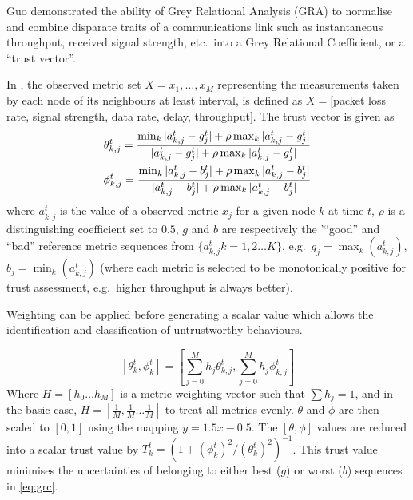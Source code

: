 Guo\cite{Guo11} demonstrated the ability of Grey Relational Analysis (GRA)\cite{Zuo1995} to normalise and combine disparate traits of a communications link such as instantaneous throughput, received signal strength, etc.\ into a Grey Relational Coefficient, or a ``trust vector''.

In \cite{Guo11}, the observed metric set $X = {x_1,\dots,x_M}$ representing the measurements taken by each node of its neighbours at least interval, is defined as $X=[$packet loss rate, signal strength, data rate, delay, throughput$]$.
The trust vector is given as
%
\begin{align}
  \theta_{k,j}^t = \frac{\min_k|a_{k,j}^t - g_j^t| + \rho \max_k|a_{k,j}^t-g_j^t|}{|a_{k,j}^t-g_j^t| + \rho \max_k|a_{k,j}^t-g_j^t|} \\
  \phi_{k,j}^t = \frac{\min_k|a_{k,j}^t - b_j^t| + \rho \max_k|a_{k,j}^t-b_j^t|}{|a_{k,j}^t-b_j^t| + \rho \max_k|a_{k,j}^t-b_j^t|} \notag 
\end{align}
%
where $a_{k,j}^t$ is the value of a observed metric $x_j$ for a given node $k$ at time $t$, $\rho$ is a distinguishing coefficient set to $0.5$, $g$ and $b$ are respectively the '``good'' and ``bad'' reference metric sequences from $\{a_{k,j}^t k=1,2\dots K\}$, e.g.\ $g_j=\max_k({a_{k,j}^t})$,  $b_j=\min_k({a_{k,j}^t})$ (where each metric is selected to be monotonically positive for trust assessment, e.g.\ higher throughput is always better).

Weighting can be applied before generating a scalar value which allows the identification and classification of untrustworthy behaviours.

%
\begin{equation}
  [\theta_k^t, \phi_k^t] = \left[\sum_{j=0}^M h_j \theta_{k,j}^t,\sum_{j=0}^M h_j \phi_{k,j}^t \right]
\end{equation}
Where $H=[h_0\dots h_M]$ is a metric weighting vector such that $\sum h_j = 1$, and in the basic case, $H=[\frac{1}{M},\frac{1}{M}\dots\frac{1}{M}]$ to treat all metrics evenly.
$\theta$ and $\phi$ are then scaled to $[0,1]$ using the mapping $y = 1.5 x - 0.5$.
The $[\theta,\phi]$ values are reduced into a scalar trust value by $T_k^t = ({1+{(\phi_k^t)^2}/{(\theta_k^t)^2}})^{-1}$.
This trust value minimises the uncertainties of belonging to either best ($g$) or worst ($b$) sequences in \eqref{eq:grc}.

